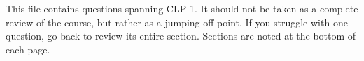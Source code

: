 


\begin{frame}

This file contains questions spanning CLP-1. It should not be taken as a complete review of the course, but rather as a jumping-off point. If you struggle with one question, go back to review its entire section. Sections are noted at the bottom of each page.
\end{frame}


